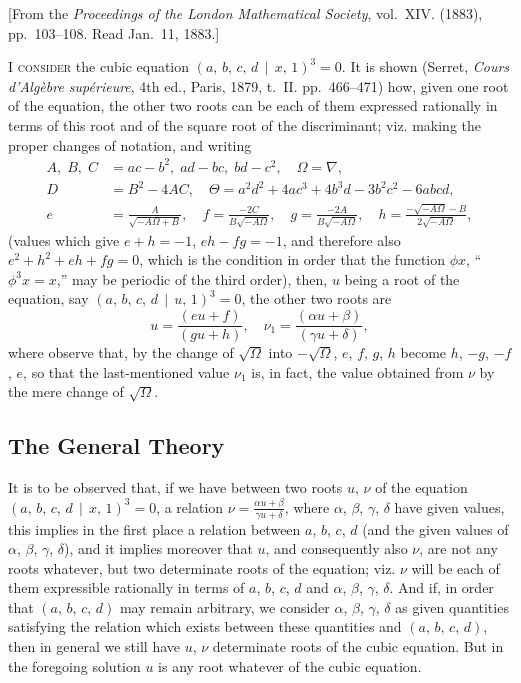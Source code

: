 \documentclass[11pt,a4paper]{article}
\theoremstyle{cayley}
\begin{document}
\begin{center}
[From the \textit{Proceedings of the London Mathematical Society}, vol.~XIV. (1883), pp.~103--108. Read Jan.~11, 1883.]
\end{center}

\textsc{I consider} the cubic equation $(a,\, b,\, c,\, d \,\!\!\mid\!\!\, x,\, 1)^{3} = 0$. It is shown (Serret, \textit{Cours d'Alg\`{e}bre sup\'{e}rieure}, 4th ed., Paris, 1879, t.~II. pp.~466--471) how, given one root of the equation, the other two roots can be each of them expressed rationally in terms of this root and of the square root of the discriminant; viz. making the proper changes of notation, and writing
\begin{align*}
A,\; B,\; C &= ac - b^{2},\; ad - bc,\; bd - c^{2},\quad \Omega = \nabla,\\
D &= B^{2} - 4AC,\quad \Theta = a^{2}d^{2} + 4ac^{3} + 4b^{3}d - 3b^{2}c^{2} - 6abcd,\\
e &= \frac{A}{\sqrt{-A\Omega + B}},\quad
f = \frac{-2C}{B\sqrt{-A\Omega}},\quad
g = \frac{-2A}{B\sqrt{-A\Omega}},\quad
h = \frac{-\sqrt{-A\Omega} - B}{2\sqrt{-A\Omega}},
\end{align*}
(values which give $e+h = -1$, $eh - fg = -1$, and therefore also $e^{2} + h^{2} + eh + fg = 0$, which is the condition in order that the function $\phi x$, ``$\phi^{3}x = x$,'' may be periodic of the third order), then, $u$ being a root of the equation, say $(a,\, b,\, c,\, d \,\!\!\mid\!\!\, u,\, 1)^{3} = 0$, the other two roots are
\[
u = \frac{(eu + f)}{(gu + h)},\quad \nu_{1} = \frac{(\alpha u + \beta)}{(\gamma u + \delta)},
\]
where observe that, by the change of $\sqrt{\Omega}$ into $-\sqrt{\Omega}$, $e$, $f$, $g$, $h$ become $h$, $-g$, $-f$, $e$, so that the last-mentioned value $\nu_{1}$ is, in fact, the value obtained from $\nu$ by the mere change of $\sqrt{\Omega}$.

\subsection*{The General Theory}

It is to be observed that, if we have between two roots $u$, $\nu$ of the equation $(a,\, b,\, c,\, d \,\!\!\mid\!\!\, x,\, 1)^{3} = 0$, a relation $\nu = \frac{\alpha u + \beta}{\gamma u + \delta}$, where $\alpha$, $\beta$, $\gamma$, $\delta$ have given values, this implies in the first place a relation between $a$, $b$, $c$, $d$ (and the given values of $\alpha$, $\beta$, $\gamma$, $\delta$), and it implies moreover that $u$, and consequently also $\nu$, are not any roots whatever, but two determinate roots of the equation; viz. $\nu$ will be each of them expressible rationally in terms of $a$, $b$, $c$, $d$ and $\alpha$, $\beta$, $\gamma$, $\delta$. And if, in order that $(a,\, b,\, c,\, d)$ may remain arbitrary, we consider $\alpha$, $\beta$, $\gamma$, $\delta$ as given quantities satisfying the relation which exists between these quantities and $(a,\, b,\, c,\, d)$, then in general we still have $u$, $\nu$ determinate roots of the cubic equation. But in the foregoing solution $u$ is any root whatever of the cubic equation.
\end{document}
